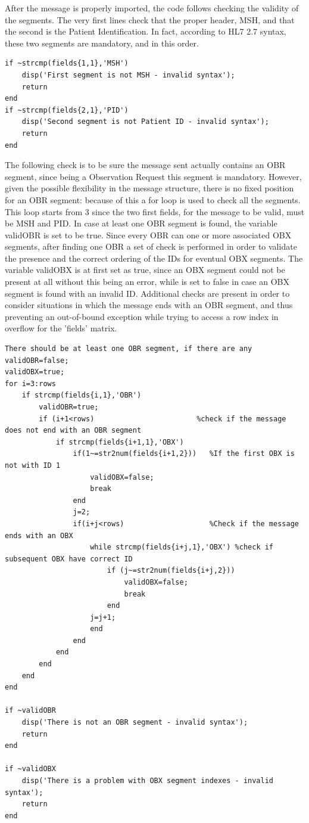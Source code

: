 \documentclass[a4paper,titlepage]{article}
\begin{document}
After the message is properly imported, the code follows checking the validity of the segments. The very first lines check that the proper header, MSH, and that the second is the Patient Identification. In fact, according to HL7 2.7 syntax, these two segments are mandatory, and in this order.

\begin{lstlisting}[caption=Validity of MSH and PID segments]
if ~strcmp(fields{1,1},'MSH')
    disp('First segment is not MSH - invalid syntax');
    return
end
if ~strcmp(fields{2,1},'PID')
    disp('Second segment is not Patient ID - invalid syntax');
    return
end
\end{lstlisting}

The following check is to be sure the message sent actually contains an OBR segment, since being a Observation Request this segment is mandatory.
However, given the possible flexibility in the message structure, there is no fixed position for an OBR segment: because of this a for loop is used to check all the segments. This loop starts from 3 since the two first fields, for the message to be valid, must be MSH and PID. In case at least one OBR segment is found, the variable validOBR is set to be true.
Since every OBR can one or more associated OBX segments, after finding one OBR a set of check is performed in order to validate the presence and the correct ordering of the IDs for eventual OBX segments.
The variable validOBX is at first set as true, since an OBX segment could not be present at all without this being an error, while is set to false in case an OBX segment is found with an invalid ID.
Additional checks are present in order to consider situations in which the message ends with an OBR segment, and thus preventing an out-of-bound exception while trying to access a row index in overflow for the 'fields' matrix.

\begin{lstlisting}[caption=Validity of OBR/OBX segments]
There should be at least one OBR segment, if there are any 
validOBR=false;
validOBX=true;
for i=3:rows
    if strcmp(fields{i,1},'OBR')
        validOBR=true;
        if (i+1<rows)                        %check if the message does not end with an OBR segment
            if strcmp(fields{i+1,1},'OBX')
                if(1~=str2num(fields{i+1,2}))   %If the first OBX is not with ID 1
                    validOBX=false;
                    break
                end
                j=2;
                if(i+j<rows)                    %Check if the message ends with an OBX
                    while strcmp(fields{i+j,1},'OBX') %check if subsequent OBX have correct ID
                        if (j~=str2num(fields{i+j,2}))
                            validOBX=false;
                            break
                        end
                    j=j+1;    
                    end
                end
            end
        end
    end
end

if ~validOBR
    disp('There is not an OBR segment - invalid syntax');
    return
end

if ~validOBX
    disp('There is a problem with OBX segment indexes - invalid syntax');
    return
end
\end{lstlisting}
\end{document}
